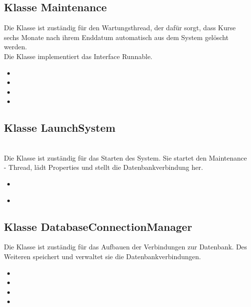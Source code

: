 	\subsection{Klasse Maintenance}
	Die Klasse ist zuständig für den Wartungsthread, der dafür sorgt, dass Kurse sechs Monate nach ihrem Enddatum automatisch aus dem System gelöscht werden.\\
	Die Klasse implementiert das Interface Runnable.
	\begin{itemize}
		\item {}
		\item {}
		\item {}
		\item \override
	\end{itemize}
	
	\subsection{Klasse LaunchSystem}
	\\
	Die Klasse ist zuständig für das Starten des System. Sie startet den Maintenance - Thread, lädt Properties und stellt die Datenbankverbindung her.
	\begin{itemize}
		\item {}\\
		\item {}\\
	\end{itemize}
	
	\subsection{Klasse DatabaseConnectionManager}
	Die Klasse ist zuständig für das Aufbauen der Verbindungen zur Datenbank. Des Weiteren
	speichert und verwaltet sie die Datenbankverbindungen. 
	\begin{itemize}
		\item {}
		\item {}
		\item {}
		\item {}
	\end{itemize}
	
